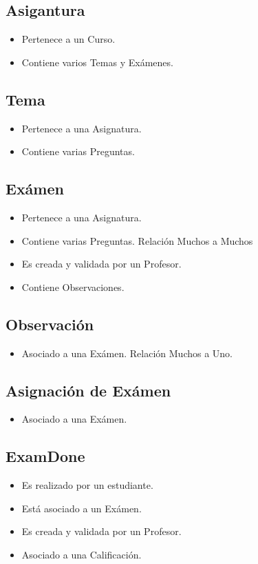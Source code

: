 \documentclass[a4paper,12pt]{article}
\begin{document}
\subsection{Asigantura}
\begin{itemize}
	\item Pertenece a un Curso.
	\item Contiene varios Temas y Exámenes.
\end{itemize}

\subsection{Tema}
\begin{itemize}
	\item Pertenece a una Asignatura.
	\item Contiene varias Preguntas.
\end{itemize}

\subsection{Exámen}
\begin{itemize}
	\item Pertenece a una Asignatura.
	\item Contiene varias Preguntas. Relación Muchos a Muchos
	\item Es creada y validada por un Profesor.
	\item Contiene Observaciones.
\end{itemize}

\subsection{Observación}
\begin{itemize}
	\item Asociado a una Exámen. Relación Muchos a Uno.
\end{itemize}

\subsection{Asignación de  Exámen}
\begin{itemize}
	\item Asociado a una Exámen. 
\end{itemize}

\subsection{ExamDone}
\begin{itemize}
	\item Es realizado por un estudiante.
	\item Está asociado a un Exámen.
	\item Es creada y validada por un Profesor.
	\item Asociado a una Calificación.
\end{itemize}
\end{document}
